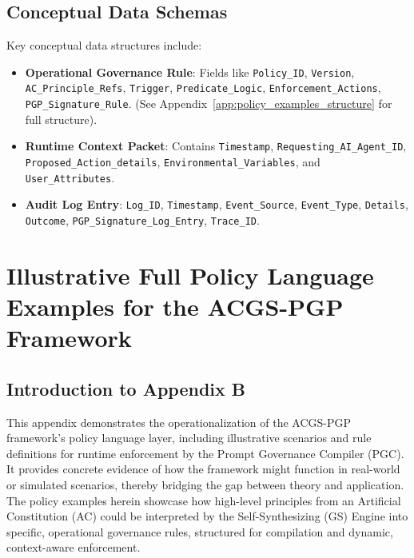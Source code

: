 \documentclass[sigconf,review,anonymous=false]{acmart} %
\begin{document}
\subsection{Conceptual Data Schemas}
\label{app:architecture_details_data_schemas}
Key conceptual data structures include:
\begin{itemize}
    \item \textbf{Operational Governance Rule}: Fields like \texttt{Policy\_ID}, \texttt{Version}, \texttt{AC\_Principle\_Refs}, \texttt{Trigger}, \texttt{Predicate\_Logic}, \texttt{Enforcement\_Actions}, \texttt{PGP\_Signature\_Rule}. (See Appendix~\ref{app:policy_examples_structure} for full structure).
    \item \textbf{Runtime Context Packet}: Contains \texttt{Timestamp}, \texttt{Requesting\_AI\_Agent\_ID}, \texttt{Proposed\_Action\_details}, \texttt{Environmental\_Variables}, and \texttt{User\_Attributes}.
    \item \textbf{Audit Log Entry}: \texttt{Log\_ID}, \texttt{Timestamp}, \texttt{Event\_Source}, \texttt{Event\_Type}, \texttt{Details}, \texttt{Outcome}, \texttt{PGP\_Signature\_Log\_Entry}, \texttt{Trace\_ID}.
\end{itemize}

\section{Illustrative Full Policy Language Examples for the ACGS-PGP Framework}
\label{app:policy_examples}
\subsection{Introduction to Appendix B}
\label{app:policy_examples_intro}
This appendix demonstrates the operationalization of the ACGS-PGP framework's policy language layer, including illustrative scenarios and rule definitions for runtime enforcement by the Prompt Governance Compiler (PGC). It provides concrete evidence of how the framework might function in real-world or simulated scenarios, thereby bridging the gap between theory and application. The policy examples herein showcase how high-level principles from an Artificial Constitution (AC) could be interpreted by the Self-Synthesizing (GS) Engine into specific, operational governance rules, structured for compilation and dynamic, context-aware enforcement.
\end{document}
